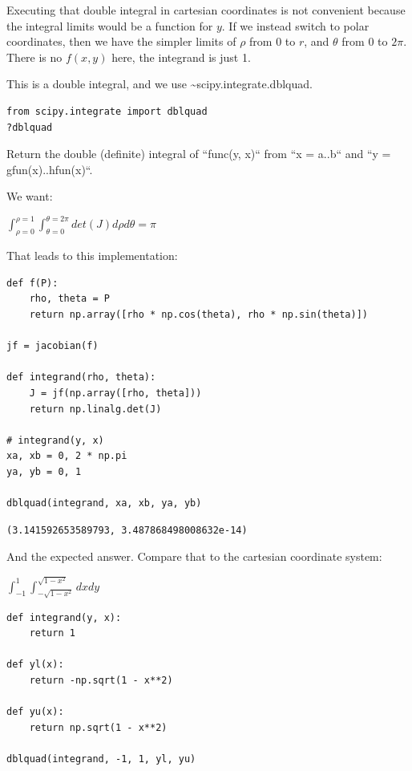 \documentclass[11pt]{article}
\begin{document}
Executing that double integral in cartesian coordinates is not convenient because the integral limits would be a function for \(y\). If we instead switch to polar coordinates, then we have the simpler limits of \(\rho\) from 0 to \(r\), and \(\theta\) from 0 to \(2\pi\). There is no \(f(x, y)\) here, the integrand is just 1.

This is a double integral, and we use \textasciitilde{}scipy.integrate.dblquad.

\begin{verbatim}
from scipy.integrate import dblquad
?dblquad
\end{verbatim}

Return the double (definite) integral of ``func(y, x)`` from ``x = a..b``
and ``y = gfun(x)..hfun(x)``.

We want:

\(\int_{\rho=0}^{\rho=1} \int_{\theta=0}^{\theta=2\pi} det(J) d\rho d\theta = \pi\)

That leads to this implementation:

\begin{verbatim}
def f(P):
    rho, theta = P
    return np.array([rho * np.cos(theta), rho * np.sin(theta)])

jf = jacobian(f)

def integrand(rho, theta):
    J = jf(np.array([rho, theta]))
    return np.linalg.det(J)

# integrand(y, x)
xa, xb = 0, 2 * np.pi
ya, yb = 0, 1

dblquad(integrand, xa, xb, ya, yb)
\end{verbatim}

\begin{verbatim}
(3.141592653589793, 3.487868498008632e-14)
\end{verbatim}

And the expected answer. Compare that to the cartesian coordinate system:

\(\int_{-1}^1 \int_{-\sqrt{1 - x^2}}^{\sqrt{1 - x^2}} dx dy\)

\begin{verbatim}
def integrand(y, x):
    return 1

def yl(x):
    return -np.sqrt(1 - x**2)

def yu(x):
    return np.sqrt(1 - x**2)

dblquad(integrand, -1, 1, yl, yu)
\end{verbatim}
\end{document}
